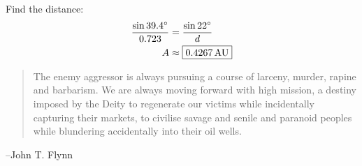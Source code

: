 \documentclass{exam}
\newcommand{\dg}{\ensuremath{^\circ}}
\begin{document}
\begin{description}
        Find the distance:
        \begin{align*}
          \frac{\sin 39.4 \dg}{0.723} & = \frac{\sin 22 \dg}{d} \\
          A                     & \approx \boxed{ \unit[0.4267]{AU} } \\
        \end{align*}

    \end{description}

  \else
    \vspace{1 cm}
    \begin{quote}
      \begin{em}
        The enemy aggressor is always pursuing a course of larceny, murder, rapine and barbarism. We are always moving
        forward with high mission, a destiny imposed by the Deity to regenerate our victims while incidentally capturing
        their markets, to civilise savage and senile and paranoid peoples while blundering accidentally into their oil
        wells. 
      \end{em}
    \end{quote}
    \hspace{1 cm} --John T. Flynn
  \fi
\end{document}
